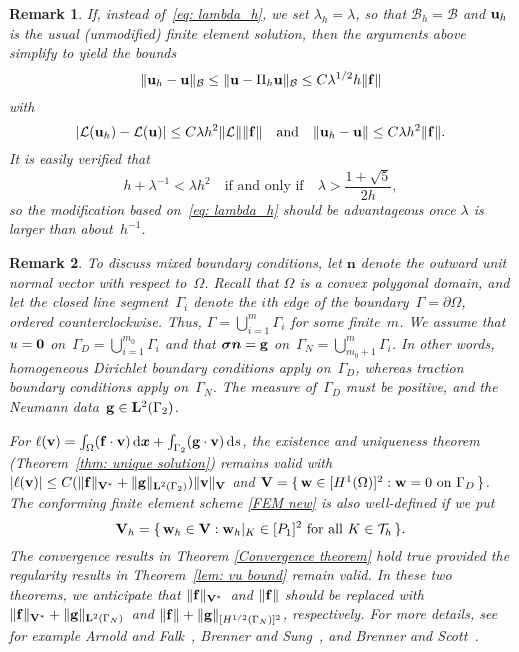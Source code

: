 \documentclass[11pt]{article}
\newcommand{\calB}{\mathcal{B}}
\newcommand{\calL}{\mathcal{L}}
\newcommand{\vf}{{\bf f}}
\newcommand{\vu}{{\bf u}}
\newcommand{\vv}{{\bf v}}
\newcommand{\vV}{{\bf V}}
\newcommand{\vw}{{\bf w}}
\newcommand{\bsx}{{\boldsymbol{x}}}
\newcommand{\vsigma}{\boldsymbol{\sigma}}
\numberwithin{equation}{section}
\newcommand{\ud}{\mathrm{d}}
\newtheorem{remark}{Remark}[section]
\begin{document}
\begin{remark}
If, instead of~\eqref{eq: lambda_h}, we set $\lambda_h=\lambda$, so
that $\calB_h=\calB$ and $\vu_h$ is the usual (unmodified) finite
element solution, then the arguments above simplify to yield the bounds
\[
\|\vu_h-\vu\|_{\calB}\le\|\vu-\Pi_h\vu\|_{\calB}
\le C\lambda^{1/2}h\|\vf\|
\]
with
\[
|\calL(\vu_h)-\calL(\vu)|\le C\lambda h^2\|\calL\|\|\vf\|
\quad\text{and}\quad
\|\vu_h-\vu\|\le C\lambda h^2\|\vf\|.
\]
It is easily verified that
\[
h+\lambda^{-1}<\lambda h^2\quad\text{if and only if}\quad
\lambda>\frac{1+\sqrt{5}}{2h},
\]
so the modification based on~\eqref{eq: lambda_h} should be
advantageous once $\lambda$ is larger than about~$h^{-1}$.
\end{remark}
\begin{remark}
To discuss mixed boundary conditions, let $\boldsymbol{n}$ denote the outward 
unit normal vector with respect to~$\Omega$. Recall that $\Omega$ is a convex polygonal domain, and let the 
closed line segment~$\Gamma_i$ denote the $i$th edge of the boundary~$\Gamma=\partial\Omega$, ordered 
counterclockwise.  Thus, $\Gamma=\bigcup_{i=1}^m \Gamma_i$ for some finite~$m$. We assume  that 
$u={\bf 0}$ on~$\Gamma_D=\bigcup_{i=1}^{m_0} \Gamma_i$ and that $\vsigma\boldsymbol{n}={\bf g}$ 
on~$\Gamma_N=\bigcup_{m_0+1}^{m} \Gamma_i$.  In other words, homogeneous Dirichlet boundary conditions
apply on~$\Gamma_D$, whereas traction boundary conditions apply on~$\Gamma_N$. The measure of~$\Gamma_D$
must be positive, and the Neumann data~${\bf g}\in{\bf L}^2(\Gamma_2)$.

For $\ell(\vv)=\int_\Omega(\vf\cdot\vv)\,\ud\bsx+\int_{\Gamma_2}({\bf g}\cdot\vv)\,\ud s$, the 
existence and uniqueness theorem (Theorem~\ref{thm: unique solution}) remains valid with 
$|\ell(\vv)|\le C(\|\vf\|_{\vV^*}+\|{\bf g}\|_{{\bf L}^2(\Gamma_2)})\|\vv\|_{\vV}$ and
$\vV=\{\,\vw\in [H^1(\Omega)]^2:\text{$\vw=0$ on $\Gamma_D$}\,\}$. The conforming finite element scheme \eqref{FEM new} is also well-defined if we put
\[\vV_h=\{\,\vw_h\in\vV:\text{$\vw_h|_K\in[P_1]^2$ for all $K\in\mathcal{T}_h$}\,\}.\]
The convergence results in Theorem \ref{Convergence theorem} hold true provided the regularity results 
in Theorem~\ref{lem: vu bound} remain valid. In these two theorems, we anticipate that 
$\|\vf\|_{\vV^*}$~and $\|\vf\|$ should be replaced with 
$\|\vf\|_{\vV^*}+\|{\bf g}\|_{{\bf L}^2(\Gamma_N)}$~and 
$\|\vf\|+\|{\bf g}\|_{[H^{1/2}(\Gamma_N)]^2}$, respectively.  For more details, see for example Arnold and 
Falk~\cite{ArnoldFalk1987}, Brenner and Sung~\cite[Lemma 2.3]{BrennerSung1992}, and Brenner and Scott~\cite[Page 319]{BrennerScott2008}.
\end{remark}
\end{document}
